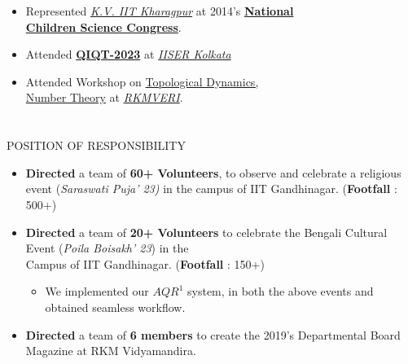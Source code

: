 \documentclass{my_cv}
\begin{document}
\begin{multicols}{2}
\begin{itemize}
\begin{itemize}
\end{itemize}
\item Represented \textit{\href{https://iitkharagpur.kvs.ac.in/}{K.V. IIT Kharagpur}} at 2014's \textbf{\href{https://ncert.nic.in/jn-national-science-exhibition.php}{National \\ Children Science Congress}}.
\item Attended \textbf{\href{https://www.youtube.com/@QIQT}{QIQT-2023}} at \textit{\href{https://www.iiserkol.ac.in/}{IISER Kolkata}}
\item Attended Workshop on \href{https://maths.rkmvu.ac.in/workshop-on-topological-dynamics-number-theory-and-related-areas-3-12-jan-2019/}{Topological Dynamics, \\ Number Theory} at \textit{\href{https://maths.rkmvu.ac.in/}{RKMVERI}}.

\end{itemize}

\vspace{-4pt}

\section{\faSitemap}{POSITION OF RESPONSIBILITY}

\begin{itemize}
    \item \textbf{Directed} a team of \textbf{60+ Volunteers}, to observe and celebrate a religious event (\textit{Saraswati Puja' 23)} in the campus of IIT Gandhinagar. (\textbf{Footfall} : 500+)
    \item \textbf{Directed} a team of \textbf{20+ Volunteers} to celebrate the Bengali Cultural Event (\textit{Poila Boisakh' 23}) in the \\ Campus of IIT Gandhinagar. (\textbf{Footfall} : 150+)
    \begin{itemize}
        \item We implemented our $AQR^{1}$ system, in both the above events and obtained seamless workflow.
    \end{itemize}
    \item \textbf{Directed} a team of \textbf{6 members} to create the 2019's Departmental Board Magazine at RKM Vidyamandira.
\end{itemize}

\vspace{-4pt}


\end{multicols}
\end{document}
